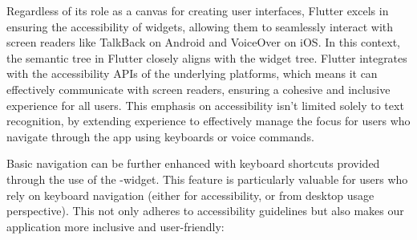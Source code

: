 \noindent Regardless of its role as a canvas for creating user interfaces, Flutter excels in ensuring the accessibility 
of widgets, allowing them to seamlessly interact with screen readers like TalkBack on Android and VoiceOver on iOS. In 
this context, the semantic tree in Flutter closely aligns with the widget tree. Flutter integrates with the 
accessibility APIs of the underlying platforms, which means it can effectively communicate with screen readers, 
ensuring a cohesive and inclusive experience for all users. This emphasis on accessibility isn't limited solely to text 
recognition, by extending experience to effectively manage the focus for users who navigate through the app using 
keyboards or voice commands.

Basic navigation can be further enhanced with keyboard shortcuts provided through the use of the -widget. 
This feature is particularly valuable for users who rely on keyboard navigation (either for accessibility, or from 
desktop usage perspective). This not only adheres to accessibility guidelines but also makes our application more 
inclusive and user-friendly:

